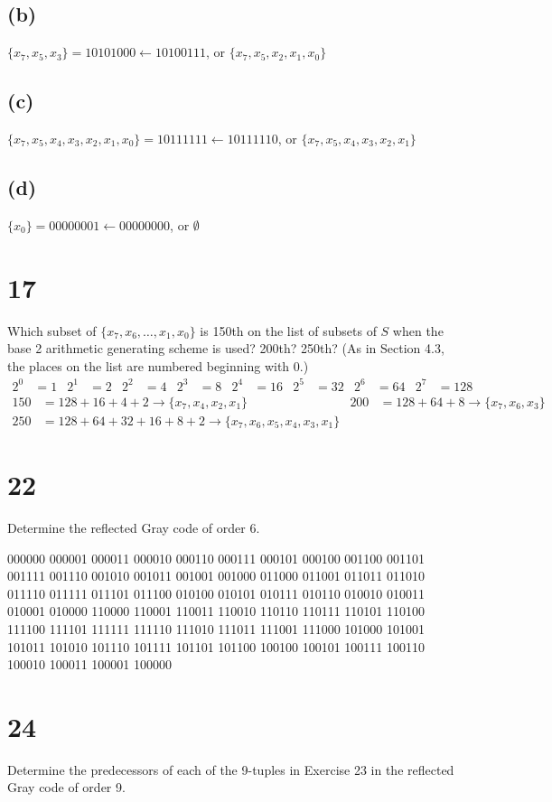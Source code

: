 \documentclass{article}
\begin{document}
\subsection*{(b)}
$\{x_7,x_5,x_3\}=10101000\gets10100111$, or $\{x_7,x_5,x_2,x_1,x_0\}$
\subsection*{(c)}
$\{x_7,x_5,x_4,x_3,x_2,x_1,x_0\}=10111111\gets10111110$, or $\{x_7,x_5,x_4,x_3,x_2,x_1\}$
\subsection*{(d)}
$\{x_0\}=00000001\gets00000000$, or $\emptyset$
\section*{17}
Which subset of $\{x_7,x_6,\dots,x_1,x_0\}$ is 150th on the list of subsets of $S$ when the base 2 arithmetic generating scheme is used? 200th? 250th? (As in Section 4.3, the places on the list are numbered beginning with 0.)
\begin{align*}
  2^0&=1&
  2^1&=2&
  2^2&=4&
  2^3&=8&
  2^4&=16&
  2^5&=32&
  2^6&=64&
  2^7&=128
\end{align*}
\begin{align*}
  150&=128+16+4+2\to\{x_7,x_4,x_2,x_1\}&
  200&=128+64+8\to\{x_7,x_6,x_3\}\\
  250&=128+64+32+16+8+2\to\{x_7,x_6,x_5,x_4,x_3,x_1\}
\end{align*}
\section*{22}
Determine the reflected Gray code of order 6.

000000 000001 000011 000010 000110 000111 000101 000100
001100 001101 001111 001110 001010 001011 001001 001000
011000 011001 011011 011010 011110 011111 011101 011100
010100 010101 010111 010110 010010 010011 010001 010000
110000 110001 110011 110010 110110 110111 110101 110100
111100 111101 111111 111110 111010 111011 111001 111000
101000 101001 101011 101010 101110 101111 101101 101100
100100 100101 100111 100110 100010 100011 100001 100000

\section*{24}
Determine the predecessors of each of the 9-tuples in Exercise 23 in the reflected Gray code of order 9.
\end{document}
